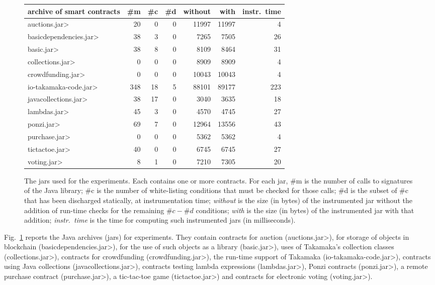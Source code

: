 \begin{figure}[t]
  \begin{center}
{\small\begin{tabular}{|l||r|r|r||r|r||r|}
  \hline
  archive of smart contracts & \#m & \#c & \#d & without & with & instr.\ time \\\hline\hline
  \<auctions.jar> & 20 & 0 & 0 & 11997 & 11997 & 4 \\\hline
  \<basicdependencies.jar> & 38 & 3 & 0 & 7265 & 7505 & 26 \\\hline
  \<basic.jar> & 38 & 8 & 0 & 8109 & 8464 & 31 \\\hline
  \<collections.jar> & 0 & 0 & 0 & 8909 & 8909 & 4 \\\hline
  \<crowdfunding.jar> & 0 & 0 & 0 & 10043 & 10043 & 4 \\\hline
  \<io-takamaka-code.jar> & 348 & 18 & 5 & 88101 & 89177 & 223 \\\hline
  \<javacollections.jar> & 38 & 17 & 0 & 3040 & 3635 & 18 \\\hline
  \<lambdas.jar> & 45 & 3 & 0 & 4570 & 4745 & 27 \\\hline
  \<ponzi.jar> & 69 & 7 & 0 & 12964 & 13556 & 43 \\\hline
  \<purchase.jar> & 0 & 0 & 0 & 5362 & 5362 & 4 \\\hline
  \<tictactoe.jar> & 40 & 0 & 0 & 6745 & 6745 & 27 \\\hline
  \<voting.jar> & 8 & 1 & 0 & 7210 & 7305 & 20 \\\hline
\end{tabular}}
  \end{center}
  \caption{The jars used for the experiments. Each
    contains one or more contracts. For each jar, \#m is the number
    of calls to signatures of the Java library;
    \#c is the number of white-listing conditions that must be checked
    for those calls; \#d is the subset of \#c that has been discharged
    statically, at instrumentation time; \emph{without} is the size
    (in bytes) of the instrumented jar without the addition of run-time checks
    for the remaining $\#c - \#d$ conditions; \emph{with}
    is the size (in bytes) of the instrumented jar with that addition;
    \emph{instr.\ time} is the time for computing such instrumented jars (in milliseconds).}
  \label{fig:experiments}
  \end{figure}
%
Fig.~\ref{fig:experiments} reports the Java archives (jars) for experiments.
They contain contracts for auction (\<auctions.jar>), for storage of
objects in blockchain (\<basicdependencies.jar>), for the use of such objects
as a library (\<basic.jar>), uses of Takamaka's collection classes
(\<collections.jar>), contracts for crowdfunding (\<crowdfunding.jar>),
the run-time support of Takamaka (\<io-takamaka-code.jar>),
contracts using Java collections (\<javacollections.jar>), contracts
testing lambda expressions (\<lambdas.jar>), Ponzi contracts
(\<ponzi.jar>), a remote purchase contract (\<purchase.jar>), a tic-tac-toe
game (\<tictactoe.jar>) and contracts for electronic voting (\<voting.jar>).


